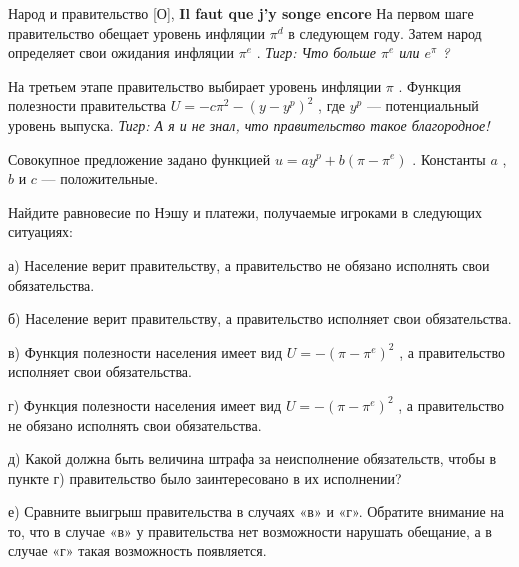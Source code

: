 \begin{problem}
\begin{sol}
\end{sol}
\end{problem}



\begin{problem}
 Народ и правительство [О], {\bf Il faut que j'y songe encore}
На первом шаге правительство обещает уровень инфляции  $\pi ^{d} $  в следующем году. Затем народ определяет свои ожидания инфляции  $\pi ^{e} $ . {\it Тигр: Что больше  $\pi ^{e} $  или  $e^{\pi } $ ?}\par
На третьем этапе правительство выбирает уровень инфляции  $\pi $ .
Функция полезности правительства  $U=-c\pi ^{2} -\left(y-y^{p} \right)^{2} $ , где  $y^{p} $  — потенциальный уровень выпуска. {\it Тигр: А я и не знал, что правительство такое благородное!}\par
Совокупное предложение задано функцией  $u=ay^{p} +b\left(\pi -\pi ^{e} \right)$ . Константы  $a$ ,  $b$  и  $c$  — положительные.\par
Найдите равновесие по Нэшу и платежи, получаемые игроками в следующих ситуациях:\par
а)      Население верит правительству, а правительство не обязано исполнять свои обязательства.\par
б)      Население верит правительству, а правительство исполняет свои обязательства.\par
в)      Функция полезности населения имеет вид  $U=-\left(\pi -\pi ^{e} \right)^{2} $ , а правительство исполняет свои обязательства.\par
г)      Функция полезности населения имеет вид  $U=-\left(\pi -\pi ^{e} \right)^{2} $ , а правительство не обязано исполнять свои обязательства.\par
д)      Какой должна быть величина штрафа за неисполнение обязательств, чтобы в пункте г) правительство было заинтересовано в их исполнении?\par
е)      Сравните выигрыш правительства в случаях «в» и «г». Обратите внимание на то, что в случае «в» у правительства нет возможности нарушать обещание, а в случае «г» такая возможность появляется.



\begin{sol}

\end{sol}
\end{problem}



